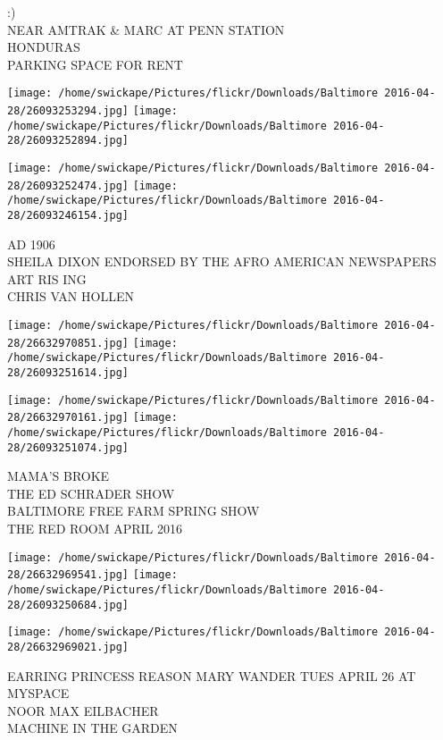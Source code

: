 \documentclass[10pt,letterpaper]{article}
\begin{document}
:)\\
NEAR AMTRAK \& MARC AT PENN STATION\\
HONDURAS\\
PARKING SPACE FOR RENT\\
\pagebreak

\texttt{[image: /home/swickape/Pictures/flickr/Downloads/Baltimore 2016-04-28/26093253294.jpg]}
\texttt{[image: /home/swickape/Pictures/flickr/Downloads/Baltimore 2016-04-28/26093252894.jpg]}

\texttt{[image: /home/swickape/Pictures/flickr/Downloads/Baltimore 2016-04-28/26093252474.jpg]}
\texttt{[image: /home/swickape/Pictures/flickr/Downloads/Baltimore 2016-04-28/26093246154.jpg]}

AD 1906\\
SHEILA DIXON ENDORSED BY THE AFRO AMERICAN NEWSPAPERS\\
ART RIS ING\\
CHRIS VAN HOLLEN\\
\pagebreak

\texttt{[image: /home/swickape/Pictures/flickr/Downloads/Baltimore 2016-04-28/26632970851.jpg]}
\texttt{[image: /home/swickape/Pictures/flickr/Downloads/Baltimore 2016-04-28/26093251614.jpg]}

\texttt{[image: /home/swickape/Pictures/flickr/Downloads/Baltimore 2016-04-28/26632970161.jpg]}
\texttt{[image: /home/swickape/Pictures/flickr/Downloads/Baltimore 2016-04-28/26093251074.jpg]}

MAMA'S BROKE\\
THE ED SCHRADER SHOW\\
BALTIMORE FREE FARM SPRING SHOW\\
THE RED ROOM APRIL 2016\\
\pagebreak

\texttt{[image: /home/swickape/Pictures/flickr/Downloads/Baltimore 2016-04-28/26632969541.jpg]}
\texttt{[image: /home/swickape/Pictures/flickr/Downloads/Baltimore 2016-04-28/26093250684.jpg]}

\vspace{0.25in}
\texttt{[image: /home/swickape/Pictures/flickr/Downloads/Baltimore 2016-04-28/26632969021.jpg]}

EARRING PRINCESS REASON MARY WANDER TUES APRIL 26 AT MYSPACE\\
NOOR MAX EILBACHER\\
MACHINE IN THE GARDEN\\
\pagebreak
\end{document}
